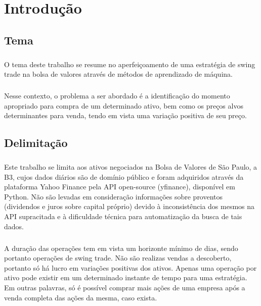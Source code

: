 \chapter{Introdução}
\label{cap1}

\section{Tema}

\paragraph{} O tema deste trabalho se resume no aperfeiçoamento de uma estratégia de swing trade na bolsa de valores através de métodos de aprendizado de máquina.

\paragraph{} Nesse contexto, o problema a ser abordado é a identificação do momento apropriado para compra de um determinado ativo, bem como os preços alvos determinantes para venda, tendo em vista uma variação positiva de seu preço.


\section{Delimitação}

\paragraph{} Este trabalho se limita aos ativos negociados na Bolsa de Valores de São Paulo, a B3, cujos dados diários são de domínio público e foram adquiridos através da plataforma Yahoo Finance pela API open-source (yfinance), disponível em Python. Não são levadas em consideração informações sobre proventos (dividendos e juros sobre capital próprio) devido à inconsistência dos mesmos na API supracitada e à dificuldade técnica para automatização da busca de tais dados.

\paragraph{} A duração das operações tem em vista um horizonte mínimo de dias, sendo portanto operações de swing trade. Não são realizas vendas a descoberto, portanto só há lucro em variações positivas dos ativos. Apenas uma operação por ativo pode existir em um determinado instante de tempo para uma estratégia. Em outras palavras, só é possível comprar mais ações de uma empresa após a venda completa das ações da mesma, caso exista.

